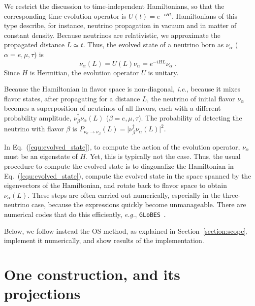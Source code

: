 \documentclass[final,5p,times,twocolumn]{elsarticle}
\newcommand{\ie}{{\it i.e.}}
\newcommand{\eg}{{\it e.g.}}
\newcommand{\eq}{Eq.}
\newcommand{\equ}[1]{\eq~(\ref{equ:#1})}
\providecommand{\DIFaddtex}[1]{{\protect\color{blue} \sf #1}} %
\providecommand{\DIFaddbegin}{} %
\providecommand{\DIFadd}[1]{\DIFaddtex{#1}} %
\begin{document}
We restrict the discussion to time-independent Hamiltonians, so that the corresponding time-evolution operator is $U\left(t\right) = e^{-iHt}$.  Hamiltonians of this type describe, for instance, neutrino propagation in vacuum and in matter of constant density.  Because neutrinos are relativistic, we approximate the propagated distance $L \simeq t$.   Thus, the evolved state of a neutrino born as $\nu_\alpha$ ($\alpha = e, \mu, \tau$) is
\begin{equation}
 \label{equ:evolved_state}
 \nu_\alpha\left(L\right) 
 = U(L) \nu_\alpha
 = e^{-iHL} \nu_\alpha \;.
\end{equation}
Since $H$ is Hermitian, the evolution operator $U$ is unitary.

Because the Hamiltonian in flavor space is non-diagonal, \ie, because it mixes flavor states, after propagating for a distance $L$, the neutrino of initial flavor $\nu_\alpha$ becomes a superposition of neutrinos of all flavors, each with a different probability amplitude, $\nu_\beta^\dagger \nu_\alpha(L)$ ($\beta = e, \mu, \tau$).  The probability of detecting the neutrino with flavor $\beta$ is $P_{\nu_\alpha \to \nu_\beta}(L) = \lvert \nu_\beta^\dagger \nu_\alpha(L) \rvert^2$.

In \equ{evolved_state}, to compute the action of the evolution operator, $\nu_\alpha$ must be an eigenstate of $H$.  Yet, this is typically not the case.  Thus, the usual procedure to compute the evolved state is to diagonalize the Hamiltonian in \equ{evolved_state}, compute the evolved state in the space spanned by the eigenvectors of the Hamiltonian, and rotate back to flavor space to obtain $\nu_\alpha(L)$.  These steps are often carried out numerically, especially in the three-neutrino case, because the expressions quickly become unmanageable.  There are numerical codes that do this efficiently, \eg, {\tt GLoBES}\ \cite{GLoBES, Kopp:2006wp, Huber:2007ji}.

Below, we follow instead the OS method, as explained in Section\ \ref{section:scope}, implement it numerically, and show results of the implementation.




\DIFaddbegin \section{\DIFadd{One construction, and its projections}}
\label{section:general_n}
\end{document}
